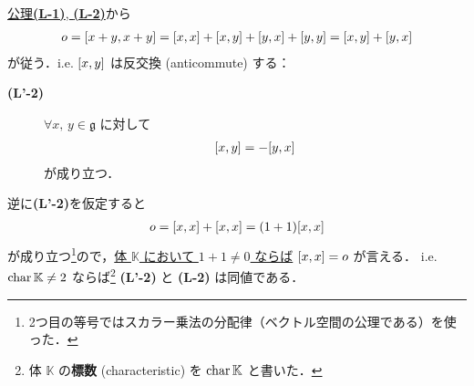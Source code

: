 \documentclass[rep_main]{subfiles}
\begin{document}
\hyperref[ax:LieAlg]{公理\textsf{\textbf{(L-1)}}, \textsf{\textbf{(L-2)}}}から
\begin{align}
    o = \comm{x+y}{x+y} = \comm{x}{x} + \comm{x}{y} + \comm{y}{x} + \comm{y}{y} = \comm{x}{y} + \comm{y}{x}
\end{align}
が従う．i.e. $\comm{x}{y}$ は反交換 (anticommute) する：
\begin{description}
    \item[\textbf{(L'-2)}] $\forall x,\, y \in \mathfrak{g}$ に対して
    \begin{align}
        \comm{x}{y} = -\comm{y}{x}
    \end{align}
    が成り立つ．
\end{description}
逆に\textsf{\textbf{(L'-2)}}を仮定すると
\begin{align}
    o = \comm{x}{x} + \comm{x}{x} = (1 + 1)\comm{x}{x}
\end{align}
が成り立つ\footnote{2つ目の等号ではスカラー乗法の分配律（ベクトル空間の公理である）を使った．}ので，\underline{体 $\mathbb{K}$ において $1 + 1 \neq 0$ ならば} $\comm{x}{x} = o$ が言える．
i.e. $\operatorname{char} \mathbb{K} \neq 2$ ならば\footnote{体 $\mathbb{K}$ の\textbf{標数} (characteristic) を $\operatorname{char} \mathbb{K}$ と書いた．} \textsf{\textbf{(L'-2)}} と \textsf{\textbf{(L-2)}} は同値である．
\end{document}
